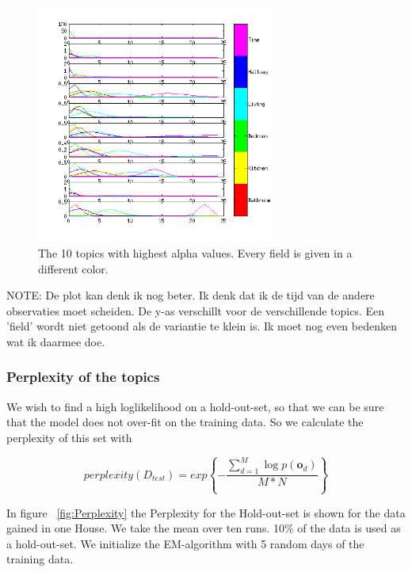 \documentclass[11pt,a4paper]{article}
\begin{document}
\begin{figure}
 \centering
 \includegraphics[width = 0.7\textwidth]{Pictures/TopicVisuLDAext1.png}
 \caption{The 10 topics with highest alpha values. Every field is given in a different color.}
 \label{fig:TopicVisu}
\end{figure}

NOTE:
De plot kan denk ik nog beter. Ik denk dat ik de tijd van de andere observaties moet scheiden. De y-as verschillt voor de verschillende topics. Een 'field' wordt niet getoond als de variantie te klein is. Ik moet nog even bedenken wat ik daarmee doe.


\subsubsection{Perplexity of the topics}
We wish to find a high loglikelihood on a hold-out-set, so that we can be sure that the model does not over-fit on the training data. So we calculate the perplexity of this set with

\begin{equation}
 perplexity(D_{test}) = exp \left\{ - \frac{\sum_{d=1}^M \log p(\textbf{o}_d ) }{M*N} \right\}
\end{equation}

In figure ~\ref{fig:Perplexity} the Perplexity for the Hold-out-set is shown for the data gained in one House. We take the mean over ten runs. 10\% of the data is used as a hold-out-set. We initialize the EM-algorithm with 5 random days of the training data.
\end{document}
